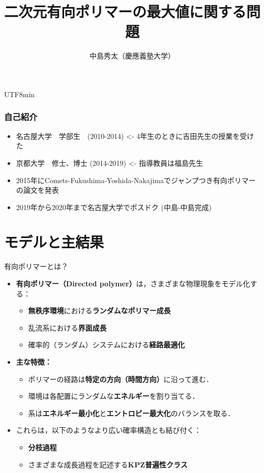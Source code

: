\documentclass{beamer}
\title{二次元有向ポリマーの最大値に関する問題}
\author{中島秀太（慶應義塾大学）}
\institute{Cl\'ement Cosco, Ofer Zeitouni との共同研究}
\date[KPT 2004] %
\begin{document}
\begin{CJK*}{UTF8}{min}
\frame{\titlepage}
\begin{frame}
\frametitle{自己紹介}
\begin{itemize}
    \item 名古屋大学　学部生　(2010-2014) <- 4年生のときに吉田先生の授業を受けた\\ 
    \item 京都大学　修士、博士  (2014-2019) <- 指導教員は福島先生 \\
    \item 2015年にComets-Fukushima-Yoshida-Nakajimaでジャンプつき有向ポリマーの論文を発表 \\
    \item 2019年から2020年まで名古屋大学でポスドク (中島-中島完成)
\end{itemize}
\end{frame}

\section{モデルと主結果}
\begin{frame}{有向ポリマーとは？}
\begin{itemize}
    \item \textbf{有向ポリマー（Directed polymer）}は，さまざまな物理現象をモデル化する：
    \begin{itemize}
        \item \textbf{無秩序環境}における\textbf{ランダムなポリマー成長}
        \item 乱流系における\textbf{界面成長}
        \item 確率的（ランダム）システムにおける\textbf{経路最適化}
    \end{itemize}
    \item \textbf{主な特徴：}
    \begin{itemize}
        \item ポリマーの経路は\textbf{特定の方向（時間方向）}に沿って進む．
        \item 環境は各配置にランダムな\textbf{エネルギー}を割り当てる．
        \item 系は\textbf{エネルギー最小化}と\textbf{エントロピー最大化}のバランスを取る．
    \end{itemize}
    \item これらは，以下のようなより広い確率構造とも結び付く：
    \begin{itemize}
        \item \textbf{分枝過程}
        \item さまざまな成長過程を記述する\textbf{KPZ普遍性クラス}
    \end{itemize}
\end{itemize}
\end{frame}


\end{CJK*}
\end{document}
